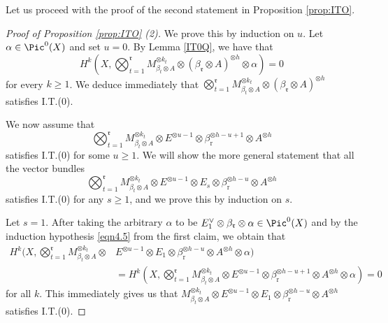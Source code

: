 \documentclass[11pt,letter]{amsart}
\numberwithin{equation}{section}
\begin{document}
   
Let us proceed with the proof of the second statement in Proposition \ref{prop:ITO}. 
   \begin{proof}[Proof of Proposition \ref{prop:ITO} (2)]  
  We prove this by induction on $u$. Let $\alpha\in \Pic^0(X)$ and set $u=0$. 
  By Lemma \ref{IT0Q}, we have that 
\[H^k\left(X,\bigotimes_{t=1}^\mathfrak{r} M_{\beta_t\otimes A}^{\otimes k_t}\otimes (\beta_{\mathfrak{r}}\otimes A)^{\otimes h}\otimes\alpha\right)=0\]
for every $k\geq 1$. We deduce immediately that 
$\bigotimes_{t=1}^\mathfrak{r} M_{\beta_t\otimes A}^{\otimes k_t}\otimes (\beta_{\mathfrak{r}}\otimes A)^{\otimes h}$ satisfies I.T.(0). 

We now assume that 
      \begin{equation}\label{eqn4.5}\bigotimes_{t=1}^{\mathfrak{r}}M_{\beta_t\otimes A}^{\otimes k_t}\otimes E^{\otimes u-1}\otimes \beta_{\mathrm{r}}^{\otimes h-u+1}\otimes A^{\otimes h} \end{equation}
      satisfies I.T.(0) for some $u\geq 1$.    
We will show the more general statement that all the vector bundles 
\begin{equation}\label{eqn:2nd}
\bigotimes_{t=1}^{\mathfrak{r}}M_{\beta_t\otimes A}^{\otimes k_t}\otimes E^{\otimes u-1}\otimes E_{s}\otimes \beta_{\mathrm{r}}^{\otimes h-u}\otimes A^{\otimes h}
\end{equation}
 satisfies I.T.(0) for any $ s\geq 1$, and we prove this by induction on $s$. 
 
 Let $s=1$. After taking the arbitrary $\alpha$ to be $E_1^\vee\otimes \beta_{\mathfrak{r}}\otimes \alpha\in\Pic^0(X)$ and by the induction hypothesis \eqref{eqn4.5} from the first claim, we obtain that 
 \begin{align*}
 H^k\Bigg(X,\bigotimes_{t=1}^\mathfrak{r} M_{\beta_t\otimes A}^{\otimes k_t}\otimes & E^{\otimes u-1}\otimes E_{1}\otimes \beta_{\mathrm{r}}^{\otimes h-u}\otimes A^{\otimes h}
\otimes\alpha\Bigg)\\
&=H^k\left(X,\bigotimes_{t=1}^\mathfrak{r} M_{\beta_t\otimes A}^{\otimes k_t}\otimes E^{\otimes u-1}\otimes \beta_{\mathrm{r}}^{\otimes h-u+1}\otimes A^{\otimes h}
\otimes\alpha\right)=0\end{align*}
for all $k$. This immediately gives us that $M_{\beta_t\otimes A}^{\otimes k_t}\otimes  E^{\otimes u-1}\otimes E_{1}\otimes \beta_{\mathrm{r}}^{\otimes h-u}\otimes A^{\otimes h}$ satisfies I.T.(0).



\end{proof}
\end{document}
